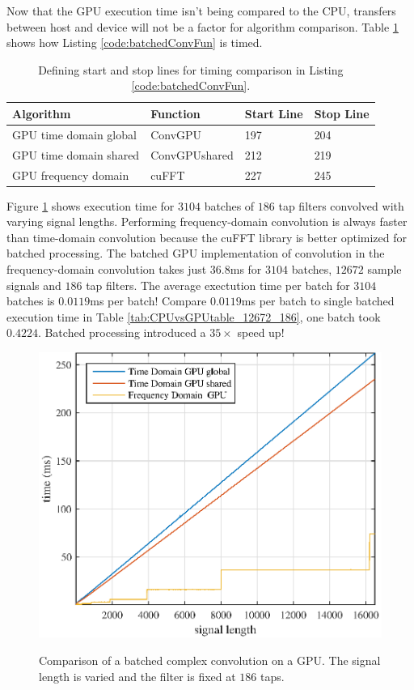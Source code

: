 Now that the GPU execution time isn't being compared to the CPU, transfers between host and device will not be a factor for algorithm comparison.
Table \ref{tab:BatchedGPUtimingTable} shows how Listing \ref{code:batchedConvFun} is timed.
\begin{table}
\caption{Defining start and stop lines for timing comparison in Listing \ref{code:batchedConvFun}.}
\begin{center}
\begin{tabular}{llll}
	\toprule
	Algorithm 				& Function		& Start Line	& Stop  Line		\\ \midrule
	GPU time domain global 	& ConvGPU 		& 197			& 204				\\
	GPU time domain shared 	& ConvGPUshared & 212			& 219				\\
	GPU frequency domain 	& cuFFT			& 227			& 245				\\ 
	\bottomrule
\end{tabular}
\end{center}
\label{tab:BatchedGPUtimingTable}
\end{table}
Figure \ref{fig:CPUvsGPU_3104batch_186taps_varySignal} shows execution time for $3104$ batches of $186$ tap filters convolved with varying signal lengths.
Performing frequency-domain convolution is always faster than time-domain convolution because the cuFFT library is better optimized for batched processing.
The batched GPU implementation of convolution in the frequency-domain convolution takes just $36.8$ms for $3104$ batches, $12672$ sample signals and $186$ tap filters.
The average exectution time per batch for $3104$ batches is $0.0119$ms per batch!
Compare $0.0119$ms per batch to single batched execution time in Table \ref{tab:CPUvsGPUtable_12672_186}, one batch took $0.4224$.
Batched processing introduced a $35\times$ speed up!
\begin{figure}
	\centering\includegraphics[width=5in]{figures/gpu_intro/CPUvsGPU_3104batch_186taps_varySignal.eps}
	\label{fig:CPUvsGPU_3104batch_186taps_varySignal}
	\caption{Comparison of a batched complex convolution on a GPU. The signal length is varied and the filter is fixed at $186$ taps.}
\end{figure}

